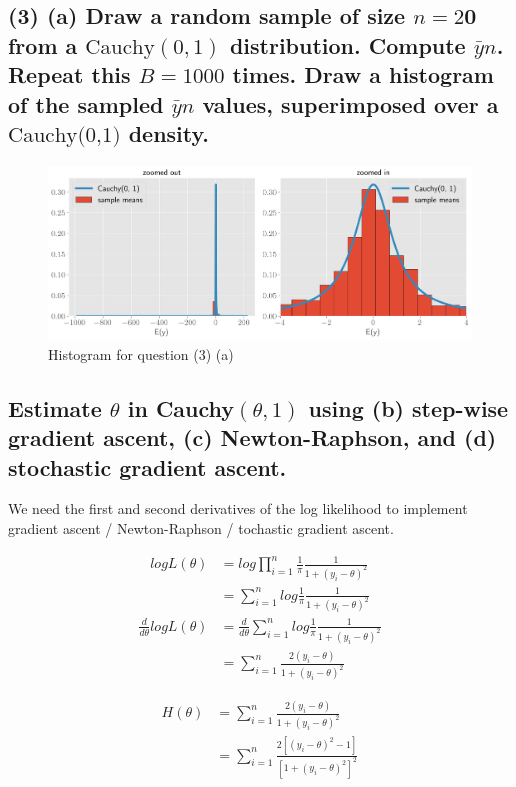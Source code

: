 \documentclass[11pt]{article}
\begin{document}
 
\subsection*{(3)  (a) Draw a random sample of size $n = 2$0 from a $\text{Cauchy}(0,1)$ distribution. Compute $\bar{y}n$. Repeat this $B = 1000$ times. Draw a histogram of the sampled $\bar{y}n$ values, superimposed over a $\text{Cauchy(0,1)}$ density.}

\begin{figure}[!h]
    \centering
    \includegraphics[scale=.55]{homework_2/figures/cauchy_mean.png}
    \caption{Histogram for question (3) (a)}
    \label{fig:my_label}
\end{figure}

\subsection*{Estimate $\theta$ in Cauchy$(\theta, 1)$ using (b) step-wise gradient ascent, (c) Newton-Raphson, and (d) stochastic gradient ascent. }

We need the first and second derivatives of the log likelihood to implement gradient ascent / Newton-Raphson / tochastic gradient ascent. 

\begin{align*} log L(\theta) &= log \prod_{i=1}^n \frac{1}{\pi}\frac{1}{1+(y_i-\theta)^2} \\
&= \sum_{i=1}^n log \frac{1}{\pi}\frac{1}{1+(y_i-\theta)^2} \end{align*}
\begin{align*} \frac{d}{d\theta}log L(\theta) &= \frac{d}{d\theta}\sum_{i=1}^n log \frac{1}{\pi}\frac{1}{1+(y_i-\theta)^2} \\
&=  \sum_{i=1}^n   \frac{2(y_i-\theta)}{1+(y_i-\theta)^2}\end{align*}

\begin{align*} H(\theta) &=\sum_{i=1}^n   \frac{2(y_i-\theta)}{1+(y_i-\theta)^2} \\
&=  \sum_{i=1}^n   \frac{2[(y_i-\theta)^2-1]}{[1+(y_i-\theta)^2]^2} \end{align*}
\end{document}
